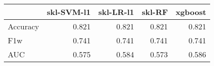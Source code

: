 \begin{tabular}{lrrrr}
\toprule
{} &  skl-SVM-l1 &  skl-LR-l1 &  skl-RF &  xgboost \\
\midrule
Accuracy &       0.821 &      0.821 &   0.821 &    0.821 \\
F1w      &       0.741 &      0.741 &   0.741 &    0.741 \\
AUC      &       0.575 &      0.584 &   0.573 &    0.586 \\
\bottomrule
\end{tabular}
